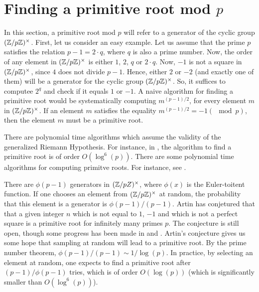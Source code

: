 \documentclass{book}
\begin{document}
\section{Finding a primitive root mod $p$}\label{sec:primroot}

In this section, a primitive root mod $p$ will refer to a  generator of the cyclic group $(\mathbb{Z}/p\mathbb{Z})^\times$. First, let us consider an easy example.
Let us assume that the prime $p$ satisfies the relation $p-1=2\cdot q$, where $q$ is also a prime number.
Now, the order of any element in $(\mathbb{Z}/p\mathbb{Z})^\times$ is either $1$, $2$, $q$ or $2 \cdot q$.
Now, $-1$ is not a square in $(\mathbb{Z}/p\mathbb{Z})^\times$, since $4$ does not divide $p-1$.
Hence, either $2$ or $-2$ (and exactly one of them) will be a generator for the cyclic group $(\mathbb{Z}/p\mathbb{Z})^\times$.
So, it suffices to computee $2^q$ and check if it equals $1$ or $-1$. A naive algorithm for finding a primitive root would be systematically computing $m^{(p-1)/2}$, for every element $m$ in $(\mathbb{Z}/p\mathbb{Z})^\times$. If an element $m$ satisfies the equality $m^{(p-1)/2} = -1 (\mod p)$, then the element $m$ must be a primitive root.

There are polynomial time algorithms which assume the validity of the generalized Riemann Hypothesis.
For instance, in \cite{shoup1992searching}, the algorithm to find a primitive root is of order $O(\log^6(p))$. There are some polynomial time algorithms for computing primitve roots. For instance, see \cite{dubrois2006efficient}.

There are $\phi(p-1)$ generators in $(\mathbb{Z}/pZ)^\times$, where $\phi(x)$ is the Euler-toitent function.
If one chooses an element from $(\mathbb{Z}/p\mathbb{Z})^\times$ at random, the probability that this element is a generator is $\phi(p-1)/(p-1)$.
Artin has conjetured that that a given integer $n$ which is not equal to $1$, $-1$ and which is not a perfect square is a primitive root for infinitely many primes $p$.
The conjecture is still open, though some progress has been made in \cite{gupta1984remark} and \cite{heath1986artin}.
Artin's conjecture gives us some hope that sampling at random will lead to a primitive root.
By the prime number theorem, $\phi(p-1)/(p-1) \sim 1/\log(p)$.
In practice, by selecting an element at random, one expects to find a primitive root after $(p-1)/\phi(p-1)$ tries, which is of order $O(\log(p))$ (which is significantly smaller than $O(\log^6(p))$).




\end{document}
